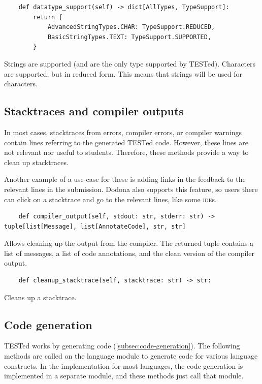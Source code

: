 \documentclass[../main]{subfiles}
\begin{document}
\begin{verbatim}
    def datatype_support(self) -> dict[AllTypes, TypeSupport]:
        return {
            AdvancedStringTypes.CHAR: TypeSupport.REDUCED,
            BasicStringTypes.TEXT: TypeSupport.SUPPORTED,
        }
\end{verbatim}

Strings are supported (and are the only type supported by TESTed).
Characters are supported, but in reduced form.
This means that strings will be used for characters.

\subsection{Stacktraces and compiler outputs}\label{subsec:error-messages-and-compiler-outputs}

In most cases, stacktraces from errors, compiler errors, or compiler warnings contain lines referring to the generated TESTed code.
However, these lines are not relevant nor useful to students.
Therefore, these methods provide a way to clean up stacktraces.

Another example of a use-case for these is adding links in the feedback to the relevant lines in the submission.
Dodona also supports this feature, so users there can click on a stacktrace and go to the relevant lines, like some \textsc{ide}s.

\begin{verbatim}
    def compiler_output(self, stdout: str, stderr: str) -> tuple[list[Message], list[AnnotateCode], str, str]
\end{verbatim}

Allows cleaning up the output from the compiler.
The returned tuple contains a list of messages, a list of code annotations, and the clean version of the compiler output.

\begin{verbatim}
    def cleanup_stacktrace(self, stacktrace: str) -> str:
\end{verbatim}

Cleans up a stacktrace.

\subsection{Code generation}\label{subsec:code-generation2}

TESTed works by generating code (\vref{subsec:code-generation}).
The following methods are called on the language module to generate code for various language constructs.
In the implementation for most languages, the code generation is implemented in a separate module, and these methods just call that module.
\end{document}
